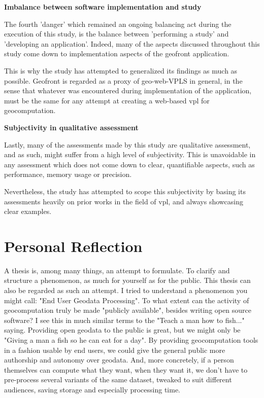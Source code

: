 \textbf{Imbalance between software implementation and study}

The fourth 'danger' which remained an ongoing balancing act during the execution of this study, is the balance between 'performing a study' and 'developing an application'. 
Indeed, many of the aspects discussed throughout this study come down to implementation aspects of the geofront application. 

This is why the study has attempted to generalized its findings as much as possible.
Geofront is regarded as a proxy of geo-web-VPLS in general, in the sense that whatever was encountered during implementation of the application, must be the same for any attempt at creating a web-based vpl for geocomputation.


\textbf{Subjectivity in qualitative assessment}

Lastly, many of the assessments made by this study are qualitative assessment, and as such, might suffer from a high level of subjectivity. 
This is unavoidable in any assessment which does not come down to clear, quantifiable aspects, such as performance, memory usage or precision. 

Nevertheless, the study has attempted to scope this subjectivity by basing its assessments heavily on prior works in the field of vpl, and always showcasing clear examples. 

\newpage

\section{Personal Reflection}
\label{sec:personal-reflection}

A thesis is, among many things, an attempt to formulate. 
To clarify and structure a phenomenon, as much for yourself as for the public. 
This thesis can also be regarded as such an attempt. 
I tried to understand a phenomenon you might call: "End User Geodata Processing". 
To what extent can the activity of geocomputation truly be made "publicly available", besides writing open source software?
I see this in much similar terms to the "Teach a man how to fish..." saying.
Providing open geodata to the public is great, but we might only be "Giving a man a fish so he can eat for a day".
By providing geocomputation tools in a fashion usable by end users, we could give the general public more authorship and autonomy over geodata. 
And, more concretely, if a person themselves can compute what they want, when they want it, we don't have to pre-process several variants of the same dataset, tweaked to suit different audiences, saving storage and especially processing time.

